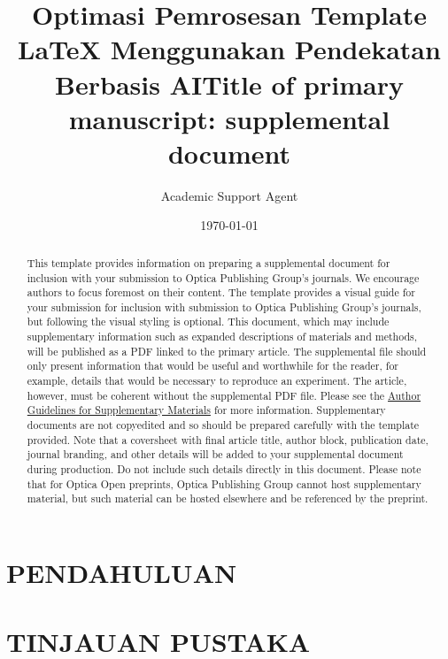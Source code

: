 \documentclass{osa-supplemental-document}
\title{Optimasi Pemrosesan Template LaTeX Menggunakan Pendekatan Berbasis AI}
\author{Academic Support Agent}
\date{\today}
\begin{document}
\maketitle

\begin{abstract}

\end{abstract}

\chapter{PENDAHULUAN}


\chapter{TINJAUAN PUSTAKA}



\title{Title of primary manuscript: supplemental document}
\author{} %

\begin{abstract}
This template provides information on preparing a supplemental document for inclusion with your submission to Optica Publishing Group's journals. We encourage authors to focus foremost on their content. The template provides a visual guide for your submission for inclusion with submission to Optica Publishing Group’s journals, but following the visual styling is optional.  This document, which may include supplementary information such as expanded descriptions of materials and methods, will be published as a PDF linked to the primary article. The supplemental file should only present information that would be useful and worthwhile for the reader, for example, details that would be necessary to reproduce an experiment. The article, however, must be coherent without the supplemental PDF file.  Please see the \href{https://opg.optica.org/submit/style/supplementary_materials.cfm}{Author Guidelines for Supplementary Materials} for more information. Supplementary documents are not copyedited and so should be prepared carefully with the template provided. Note that a coversheet with final article title, author block, publication date, journal branding, and other details will be added to your supplemental document during production. Do not include such details directly in this document. Please note that for Optica Open preprints, Optica Publishing Group cannot host supplementary material, but such material can be hosted elsewhere and be referenced by the preprint.
\end{abstract}
\end{document}
